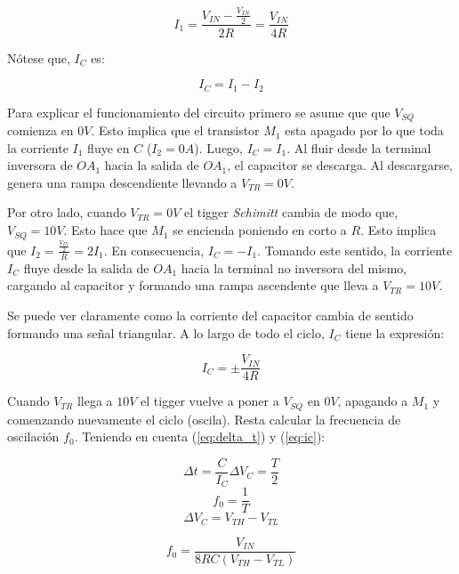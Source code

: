 \documentclass[12pt,a4paper]{article}
\begin{document}
\begin{displaymath}
    I_1 = \frac{V_{IN} - \frac{V_{IN}}{2}}{2R} = \frac{V_{IN}}{4R}
\end{displaymath}

Nótese que, $I_C$ es:

\begin{displaymath}
    I_C = I_1 - I_2
\end{displaymath}

Para explicar el funcionamiento del circuito primero se asume que que $V_{SQ}$ comienza en $0V$. Esto implica que el transistor $M_1$ esta apagado por lo que toda la corriente $I_1$ fluye en $C$ ($I_2 = 0A$). Luego, $I_C = I_1$. Al fluir desde la terminal inversora de $OA_1$ hacia la salida de $OA_1$, el capacitor se descarga. Al descargarse, genera una rampa descendiente llevando a $V_{TR} = 0V$. 

Por otro lado, cuando $V_{TR} = 0V$ el tigger \textit{Schimitt} cambia de modo que, $V_{SQ} = 10V$. Esto hace que $M_1$ se encienda poniendo en corto a $R$. Esto implica que $I_2 = \frac{\frac{V_{IN}}{2}}{R} = 2 I_1$. En consecuencia, $I_C = -I_1$. Tomando este sentido, la corriente $I_C$ fluye desde la salida de $OA_1$ hacia la terminal no inversora del mismo, cargando al capacitor y formando una rampa ascendente que lleva a $V_{TR} = 10V$.  

Se puede ver claramente como la corriente del capacitor cambia de sentido formando una señal triangular. A lo largo de todo el ciclo, $I_C$ tiene la expresión:

\begin{equation}
    I_C = \pm \frac{V_{IN}}{4R}
    \label{eq:ic}
\end{equation}




Cuando $V_{TR}$ llega a $10V$ el tigger vuelve a poner a $V_{SQ}$ en $0V$, apagando a $M_1$ y comenzando nuevamente el ciclo (oscila). Resta calcular la frecuencia de oscilación $f_0$. Teniendo en cuenta (\ref{eq:delta_t}) y (\ref{eq:ic}):


\begin{displaymath} \Delta t = \frac{C}{I_C} \Delta V_C = \frac{T}{2} \end{displaymath}
\begin{displaymath} f_0 = \frac{1}{T} \end{displaymath}
\begin{displaymath} \Delta V_C = V_{TH} - V_{TL} \end{displaymath}

\begin{equation}
    f_0 = \frac{V_{IN}}{8RC (V_{TH} - V_{TL})}
    \label{eq:f0_vco}
\end{equation}
\end{document}
